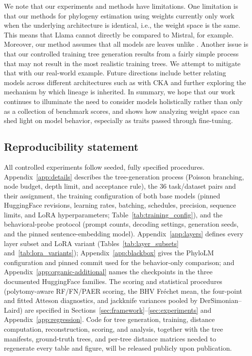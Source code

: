 \documentclass{article}
\theoremstyle{definition}
\theoremstyle{plain}
\begin{document}
We note that our experiments and methods have limitations.  One limitation is that our methods for phylogeny estimation using weights currently only work when the underlying architecture is identical, i.e., the weight space is the same.  This means that Llama cannot directly be compared to Mistral, for example. Moreover, our method assumes that all models are leaves unlike \cite{horwitz2025mother}. Another issue is that our controlled training tree generation results from a fairly simple process that may not result in the most realistic training trees.  We attempt to mitigate that with our real-world example. Future directions include better relating models across different architectures such as with CKA and further exploring the mechanism by which lineage is inherited. In summary, we hope that our work continues to illuminate the need to consider models holistically rather than only as a collection of benchmark scores, and shows how analyzing weight space can shed light on model behavior, especially as traits passed through fine-tuning.



\subsection*{Reproducibility statement}
All controlled experiments follow seeded, fully specified procedures. Appendix~\ref{app:details}
describes the tree-generation process (Poisson branching, node budget, depth limit, and acceptance
rule), the 36 task/dataset pairs and their assignment, the training configuration of both base models
(pinned HuggingFace revisions, learning rates, batching, schedules, precision, sequence limits, and
LoRA hyperparameters; Table~\ref{tab:training_config}), and the behavioral-probe protocol (prompt
counts, decoding settings, generation seeds, and the pinned sentence-embedding model).
Appendix~\ref{app:layers} defines every layer subset and LoRA variant (Tables~\ref{tab:layer_subsets}
and~\ref{tab:lora_variants}); Appendix~\ref{app:blackbox} gives the PhyloLM configuration and pinned
commit used for the behavior-only comparison; and Appendix~\ref{app:organic-additional} names the
checkpoints in the three documented HuggingFace families. The scoring and statistical procedures
(polytomy-aware RF/FN/PAER scoring, the BHV Fr\'echet mean, the four-point and fitted Atteson
diagnostics, and jackknife variances pooled by DerSimonian--Laird) are specified in
Sections~\ref{sec:framework}--\ref{sec:experiments} and Appendix~\ref{app:regression}. Code for tree
generation, training, distance computation, reconstruction, scoring, and analysis, together with the
tree manifests, ground-truth trees, and per-tree distance matrices needed to regenerate every table
and figure, will be released publicly upon publication.
\end{document}
